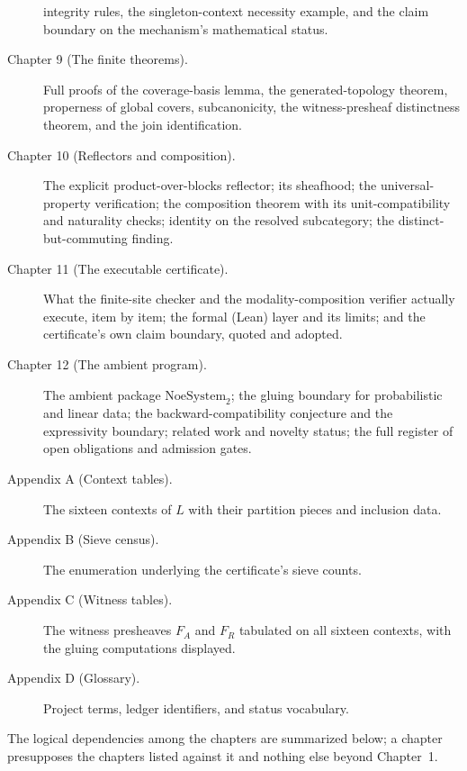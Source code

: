 \begin{description}
integrity rules, the singleton-context necessity example, and the claim
boundary on the mechanism's mathematical status.
\item[Chapter 9 (The finite theorems).] Full proofs of the coverage-basis
lemma, the generated-topology theorem, properness of global covers,
subcanonicity, the witness-presheaf distinctness theorem, and the join
identification.
\item[Chapter 10 (Reflectors and composition).] The explicit
product-over-blocks reflector; its sheafhood; the universal-property
verification; the composition theorem with its unit-compatibility and
naturality checks; identity on the resolved subcategory; the
distinct-but-commuting finding.
\item[Chapter 11 (The executable certificate).] What the finite-site
checker and the modality-composition verifier actually execute, item by
item; the formal (Lean) layer and its limits; and the certificate's own
claim boundary, quoted and adopted.
\item[Chapter 12 (The ambient program).] The ambient package
$\mathrm{NoeSystem}_2$; the gluing boundary for probabilistic and linear
data; the backward-compatibility conjecture and the expressivity boundary;
related work and novelty status; the full register of open obligations and
admission gates.
\item[Appendix A (Context tables).] The sixteen contexts of $L$ with their
partition pieces and inclusion data.
\item[Appendix B (Sieve census).] The enumeration underlying the
certificate's sieve counts.
\item[Appendix C (Witness tables).] The witness presheaves $F_A$ and $F_R$
tabulated on all sixteen contexts, with the gluing computations displayed.
\item[Appendix D (Glossary).] Project terms, ledger identifiers, and status
vocabulary.
\end{description}

The logical dependencies among the chapters are summarized below; a
chapter presupposes the chapters listed against it and nothing else beyond
Chapter~1.

